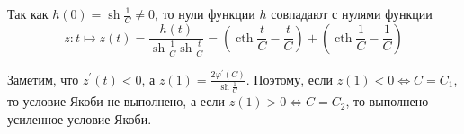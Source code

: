 \begin{task}
Так как $h(0)=\operatorname{sh} \frac{1}{C} \neq 0$, то нули функции $h$ совпадают с нулями функции
$$
z: t \mapsto z(t)=\frac{h(t)}{\operatorname{sh} \frac{1}{C} \operatorname{sh} \frac{t}{C}}=\left(\operatorname{cth} \frac{t}{C}-\frac{t}{C}\right)+\left(\operatorname{cth} \frac{1}{C}-\frac{1}{C}\right)
$$

Заметим, что $z^{\prime}(t)<0$, а $z(1) = \frac{2 \varphi^{\prime}(C)}{\operatorname{sh} \frac{1}{C}}$. 
Поэтому, если $z(1)<0 \Leftrightarrow C=C_1$, то условие Якоби не выполнено, а если $z(1) > 0 \Leftrightarrow C=C_2$, 
то выполнено усиленное условие Якоби.

\end{task}